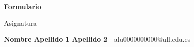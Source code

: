 \begin{titlepage}
	\thispagestyle{titlepage} %
	\vspace*{8cm}
	\begin{center}
		{\fontsize{28pt}{28pt}\selectfont\textbf{\textcolor{custompurple}{Formulario}}}
		
		\vspace{0.5cm} %
		
		{\fontsize{24pt}{24pt}\selectfont\textcolor{custompurple}{Asignatura}}
		
		\vspace{1cm}
		
		\textbf{Nombre Apellido 1 Apellido 2} - alu0000000000@ull.edu.es
	\end{center}
	\vfill
\end{titlepage}
